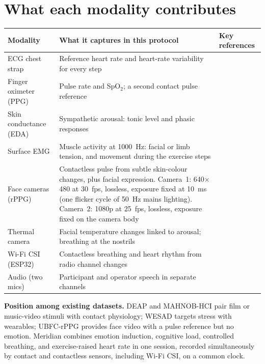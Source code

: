 \documentclass[11pt,a4paper]{article}
\begin{document}
\section{What each modality contributes}

{\small
\begin{tabularx}{\linewidth}{@{}p{3.1cm}X p{3.2cm}@{}}
\toprule
Modality & What it captures in this protocol & Key references \\
\midrule
ECG chest strap & Reference heart rate and heart-rate variability for every step & \cite{taskforce1996,laborde2017} \\
Finger oximeter (PPG) & Pulse rate and SpO$_2$; a second contact pulse reference & \cite{allen2007} \\
Skin conductance (EDA) & Sympathetic arousal: tonic level and phasic responses & \cite{boucsein2012} \\
Surface EMG & Muscle activity at 1000~Hz: facial or limb tension, and movement during the exercise steps &
  \cite{hermens2000} \\
Face cameras (rPPG) & Contactless pulse from subtle skin-colour changes, plus facial expression. Camera~1: 640$\times$480
  at 30~fps, lossless, exposure fixed at 10~ms (one flicker cycle of 50~Hz mains lighting). Camera~2: 1080p at
  25~fps, lossless, exposure fixed on the camera body & \cite{verkruysse2008,mcduff2023} \\
Thermal camera & Facial temperature changes linked to arousal; breathing at the nostrils & \cite{ioannou2014} \\
Wi-Fi CSI (ESP32) & Contactless breathing and heart rhythm from radio channel changes & \cite{liu2015,wang2016resp,zhao2016} \\
Audio (two mics) & Participant and operator speech in separate channels & \cite{schuller2018} \\
\bottomrule
\end{tabularx}
}

\medskip
\textbf{Position among existing datasets.} DEAP \cite{koelstra2012} and MAHNOB-HCI \cite{soleymani2012} pair film or
music-video stimuli with contact physiology; WESAD \cite{schmidt2018} targets stress with wearables; UBFC-rPPG
\cite{bobbia2019} provides face video with a pulse reference but no emotion. Meridian combines emotion induction,
cognitive load, controlled breathing, and exercise-raised heart rate in one session, recorded simultaneously by
contact and contactless sensors, including Wi-Fi CSI, on a common clock.
\end{document}
